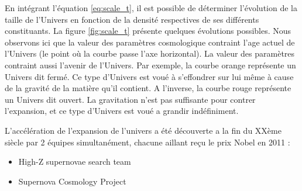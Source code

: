 En intégrant l’équation \ref{eq:scale_t}, il est possible de déterminer l'évolution de la taille de l'Univers en fonction de la densité respectives de ses différents constituants.
La figure \ref{fig:scale_t} présente quelques évolutions possibles.
Nous observons ici que la valeur des paramètres cosmologique contraint l'age actuel de l'Univers (le point où la courbe passe l'axe horizontal).
La valeur des paramètres contraint aussi l'avenir de l'Univers.
Par exemple, la courbe orange représente un Univers dit fermé.
Ce type d'Univers est voué à s'effondrer sur lui même à cause de la gravité de la matière qu'il contient.
A l'inverse, la courbe rouge représente un Univers dit ouvert.
La gravitation n'est pas suffisante pour contrer l'expansion, et ce type d'Univers est voué a grandir indéfiniment.

L'accélération de l'expansion de l'univers a été découverte a la fin du XXème siècle par 2 équipes simultanément, chacune aillant reçu le prix Nobel en 2011 :
\begin{itemize}
\item  High-Z supernovae search team \citep{1998AJ....116.1009R} %
\item  Supernova Cosmology Project \citep{1999ApJ...517..565P} %
\end{itemize}


